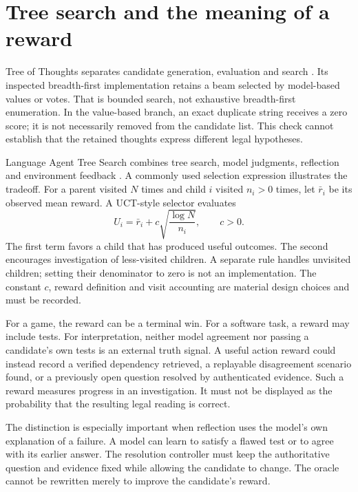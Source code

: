 \section{Tree search and the meaning of a reward}
\label{merge:M05:07}


Tree of Thoughts separates candidate generation, evaluation and search
\citep[section 3]{treeofthoughts2023}. Its inspected breadth-first implementation
retains a beam selected by model-based values or votes. That is bounded search,
not exhaustive breadth-first enumeration. In the value-based branch,
an exact duplicate string receives a zero score; it is not necessarily
removed from the candidate list. This check cannot establish that the
retained thoughts express different legal hypotheses.

Language Agent Tree Search combines tree search, model judgments, reflection and
environment feedback \citep[sections 3.2--4 and appendix A]{lats2024}. A commonly
used selection expression illustrates the tradeoff. For a parent visited $N$
times and child $i$ visited $n_i>0$ times, let $\bar r_i$ be its observed mean
reward. A UCT-style selector evaluates
\begin{equation}
 U_i=\bar r_i+c\sqrt{\frac{\log N}{n_i}},\qquad c>0.
 \label{eq:uct}
\end{equation}
The first term favors a child that has produced useful outcomes. The second
encourages investigation of less-visited children. A separate rule handles
unvisited children; setting their denominator to zero is not an implementation.
The constant $c$, reward definition and visit accounting are material design
choices and must be recorded.


For a game, the reward can be a terminal win. For a software task, a reward may
include tests. For interpretation, neither model agreement nor passing a
candidate's own tests is an external truth signal. A useful action reward could
instead record a verified dependency retrieved, a replayable disagreement
scenario found, or a previously open question resolved by authenticated evidence.
Such a reward measures progress in an investigation. It must not be displayed as
the probability that the resulting legal reading is correct.

The distinction is especially important when reflection uses the model's own
explanation of a failure. A model can learn to satisfy a flawed test or to agree
with its earlier answer. The resolution controller must keep the authoritative
question and evidence fixed while allowing the candidate to change. The oracle
cannot be rewritten merely to improve the candidate's reward.

